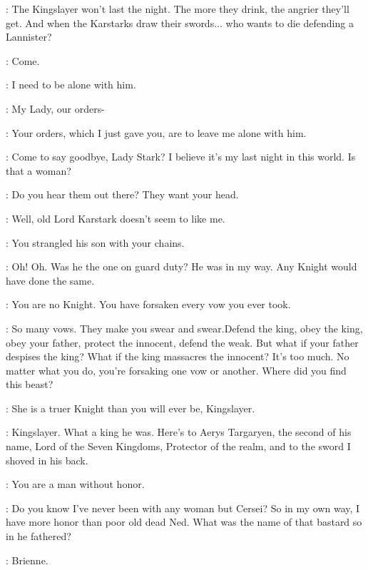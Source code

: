 \BRIENNE: The Kingslayer won't last the night. The more they drink, the angrier they'll get. And when the Karstarks draw their swords$\ldots$ who wants to die defending a Lannister?

\CATELYN: Come.


\CATELYN: I need to be alone with him.

\GUARD: My Lady, our orders-

\CATELYN: Your orders, which I just gave you, are to leave me alone with him.


\JAIME: Come to say goodbye, Lady Stark? I believe it's my last night in this world. Is that a woman?


\CATELYN: Do you hear them out there? They want your head.

\JAIME: Well, old Lord Karstark doesn't seem to like me.

\CATELYN: You strangled his son with your chains.

\JAIME: Oh! Oh. Was he the one on guard duty? He was in my way. Any Knight would have done the same.

\CATELYN: You are no Knight. You have forsaken every vow you ever took.

\JAIME: So many vows. They make you swear and swear.Defend the king, obey the king, obey your father, protect the innocent, defend the weak. But what if your father despises the king? What if the king massacres the innocent? It's too much. No matter what you do, you're forsaking one vow or another. Where did you find this beast?


\CATELYN: She is a truer Knight than you will ever be, Kingslayer.

\JAIME: Kingslayer. What a king he was. Here's to Aerys Targaryen, the second of his name, Lord of the Seven Kingdoms, Protector of the realm, and to the sword I shoved in his back.

\CATELYN: You are a man without honor.

\JAIME: Do you know I've never been with any woman but Cersei? So in my own way, I have more honor than poor old dead Ned. What was the name of that bastard so in he fathered?

\CATELYN: Brienne.

